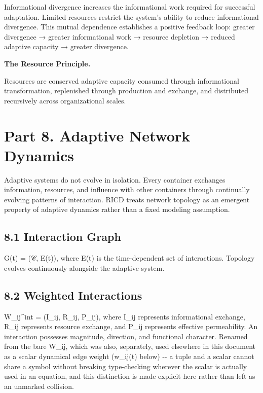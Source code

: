 \documentclass[
]{article}
\begin{document}
Informational divergence increases the informational work required for
successful adaptation. Limited resources restrict the system's ability
to reduce informational divergence. This mutual dependence establishes a
positive feedback loop: greater divergence → greater informational work
→ resource depletion → reduced adaptive capacity → greater divergence.

\textbf{The Resource Principle.}

Resources are conserved adaptive capacity consumed through informational
transformation, replenished through production and exchange, and
distributed recursively across organizational scales.

\hypertarget{part-8.-adaptive-network-dynamics}{%
\section{Part 8. Adaptive Network
Dynamics}\label{part-8.-adaptive-network-dynamics}}

Adaptive systems do not evolve in isolation. Every container exchanges
information, resources, and influence with other containers through
continually evolving patterns of interaction. RICD treats network
topology as an emergent property of adaptive dynamics rather than a
fixed modeling assumption.

\hypertarget{interaction-graph}{%
\subsection{8.1 Interaction Graph}\label{interaction-graph}}

G(t) = (𝒞, E(t)), where E(t) is the time-dependent set of interactions.
Topology evolves continuously alongside the adaptive system.

\hypertarget{weighted-interactions}{%
\subsection{8.2 Weighted Interactions}\label{weighted-interactions}}

W\_ij\^{}int = (I\_ij, R\_ij, P\_ij), where I\_ij represents
informational exchange, R\_ij represents resource exchange, and P\_ij
represents effective permeability. An interaction possesses magnitude,
direction, and functional character. Renamed from the bare W\_ij, which
was also, separately, used elsewhere in this document as a scalar
dynamical edge weight (w\_ij(t) below) -\/- a tuple and a scalar cannot
share a symbol without breaking type-checking wherever the scalar is
actually used in an equation, and this distinction is made explicit here
rather than left as an unmarked collision.
\end{document}
